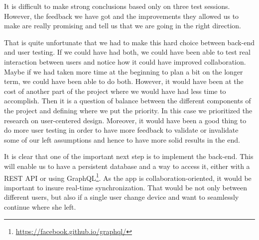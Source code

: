 \documentclass[a4paper,12pt, oneside]{article}
\begin{document}
It is difficult to make strong conclusions based only on three test sessions.
However, the feedback we have got and the improvements they allowed us to make are really promising and tell us that we are going in the right direction.


That is quite unfortunate that we had to make this hard choice between back-end and user testing.
If we could have had both, we could have been able to test real interaction between users and notice how it could have improved collaboration.
Maybe if we had taken more time at the beginning to plan a bit on the longer term, we could have been able to do both.
However, it would have been at the cost of another part of the project where we would have had less time to accomplish.
Then it is a question of balance between the different components of the project and defining where we put the priority.
In this case we prioritized the research on user-centered design.
Moreover, it would have been a good thing to do more user testing in order to have more feedback to validate or invalidate some of our left assumptions and hence to have more solid results in the end.

It is clear that one of the important next step is to implement the back-end.
This will enable us to have a persistent database and a way to access it, either with a REST API or using GraphQL\footnote{\url{https://facebook.github.io/graphql/}}.
As the app is collaboration-oriented, it would be important to insure real-time synchronization.
That would be not only between different users, but also if a single user change device and want to seamlessly continue where she left.

\clearpage


\end{document}
